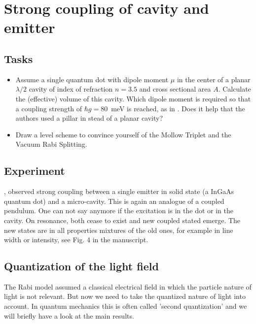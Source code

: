 \renewcommand{\lastmod}{June 3, 2020}


\chapter{Strong coupling of cavity and emitter}




\section{Tasks}

\begin{itemize}
\item Assume a single quantum dot with dipole moment $\mu$  in the center of a planar $\lambda/2$ cavity of index of refraction $n=3.5$ and cross sectional area $A$. Calculate the (effective) volume of this cavity.
Which dipole moment is required so that a coupling strength of $\hbar g = 80$~meV is reached, as in \cite{Reithmaier04}. Does it help that the authors used a pillar in stead of a planar cavity?

\item Draw a level scheme to convince yourself of the Mollow Triplet and the Vacuum Rabi Splitting.
\end{itemize}



\section{Experiment}

\cite{Reithmaier04}, observed strong coupling between a single emitter in solid state (a InGaAs quantum dot) and a micro-cavity. This is again an analogue of a coupled pendulum. One can not say anymore if the excitation is in the dot or in the cavity. On resonance, both cease to exist and new coupled stated emerge. The new states are in all properties mixtures of the old ones, for example in line width or intensity, see Fig. 4 in the manuscript.

\section{Quantization of the light field}
The Rabi model assumed a classical electrical field in which the particle nature of light is not relevant. But now we need to take the quantized nature of light into account. In quantum mechanics this is often called 'second quantization' and we will briefly have a look at the main results.


